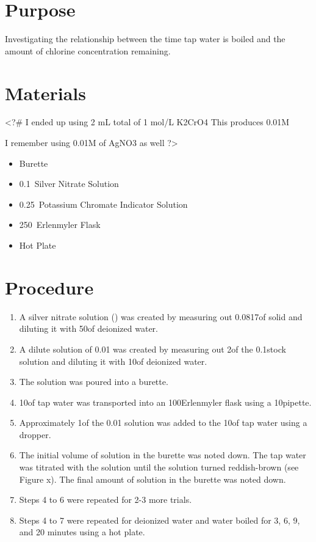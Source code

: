 \documentclass[12pt]{article}
\begin{document}
\section*{Purpose}
Investigating the relationship between the time tap water is boiled and the amount of chlorine concentration remaining.

\section*{Materials}

<?#
I ended up using 2 mL total of 1 mol/L K2CrO4
This produces 0.01M

I remember using 0.01M of AgNO3 as well
?>

\begin{itemize}
	\item Burette
	\item 0.1\mpl~Silver Nitrate Solution
	\item 0.25\mpl~Potassium Chromate Indicator Solution
	\item 250\ml~Erlenmyler Flask
	\item Hot Plate
\end{itemize}

\section*{Procedure}

\begin{enumerate}
	\item A silver nitrate solution () was created by measuring out 0.0817\g of solid  and diluting it with 50\ml of deionized water.
	\item A dilute solution of 0.01\mpl {} was created by measuring out 2\ml of the 0.1\mpl stock solution and diluting it with 10\ml of deionized water.
	\item The  solution was poured into a burette.
	\item 10\ml of tap water was transported into an 100\ml Erlenmyler flask using a 10\ml pipette.
	\item Approximately 1\ml of the 0.01\mpl {} solution was added to the 10\ml of tap water using a dropper.
	\item The initial volume of  solution in the burette was noted down. The tap water was titrated with the  solution until the solution turned reddish-brown (see Figure x). The final amount of solution in the burette was noted down.
	\item Steps 4 to 6 were repeated for 2-3 more trials.
	\item Steps 4 to 7 were repeated for deionized water and water boiled for 3, 6, 9, and 20 minutes using a hot plate.
\end{enumerate}
\end{document}
